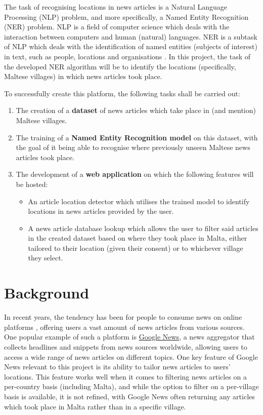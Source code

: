 \documentclass[a4paper, oneside, 11pt]{article}
\begin{document}
\begin{multicols*}{2}
  The task of recognising locations in news articles is a Natural Language Processing (NLP) problem, and more specifically, a Named Entity Recognition (NER) problem. NLP is a field of computer science which deals with the interaction between computers and human (natural) languages. NER is a subtask of NLP which deals with the identification of named entities (subjects of interest) in text, such as people, locations and organisations \cite{nadeau2007survey}. In this project, the task of the developed NER algorithm will be to identify the locations (specifically, Maltese villages) in which news articles took place.

  To successfully create this platform, the following tasks shall be carried out:
  \begin{enumerate}
    \item The creation of a \textbf{dataset} of news articles which take place in (and mention) Maltese villages.
    \item The training of a \textbf{Named Entity Recognition model} on this dataset, with the goal of it being able to recognise where previously unseen Maltese news articles took place.
    \item The development of a \textbf{web application} on which the following features will be hosted:
          \begin{itemize}
            \item An article location detector which utilises the trained model to identify locations in news articles provided by the user.
            \item A news article database lookup which allows the user to filter said articles in the created dataset based on where they took place in Malta, either tailored to their location (given their consent) or to whichever village they select.
          \end{itemize}
  \end{enumerate}


  \section{Background}
  In recent years, the tendency has been for people to consume news on online platforms \cite{bennett2008digital} \cite{ripolles2012beyond}, offering users a vast amount of news articles from various sources. One popular example of such a platform is \href{https://news.google.com/}{Google News}, a news aggregator that collects headlines and snippets from news sources worldwide, allowing users to access a wide range of news articles on different topics. One key feature of Google News relevant to this project is its ability to tailor news articles to users' locations. This feature works well when it comes to filtering news articles on a per-country basis (including Malta), and while the option to filter on a per-village basis is available, it is not refined, with Google News often returning any articles which took place in Malta rather than in a specific village.


\end{multicols*}
\end{document}
